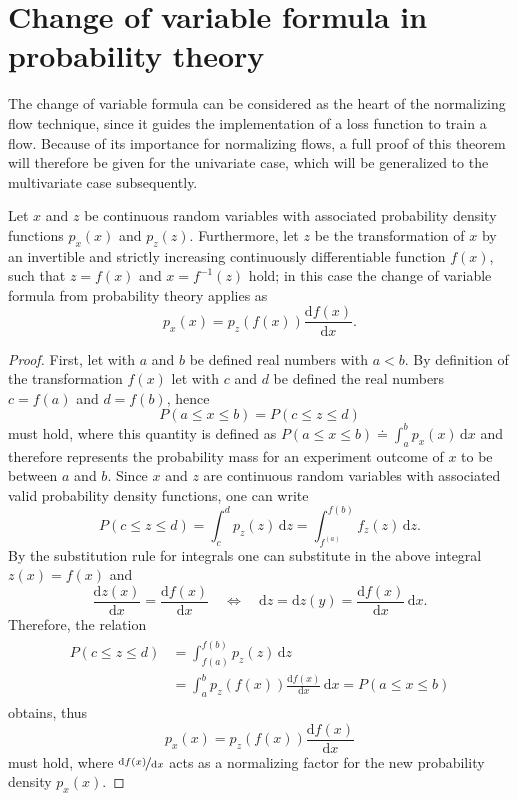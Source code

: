 \documentclass[a4paper,12pt]{report}
\begin{document}
\section{Change of variable formula in probability theory}
The change of variable formula can be considered as the heart of the normalizing flow technique, since it guides the implementation of a loss function to train a flow. Because of its importance for normalizing flows, a full proof of this theorem will therefore be given for the univariate case, which will be generalized to the multivariate case subsequently.
\begin{tm}
Let $x$ and $z$ be continuous random variables with associated probability density functions $p_x(x)$ and $p_z(z)$. Furthermore, let $z$ be the transformation of $x$ by an invertible and strictly increasing continuously differentiable function $f(x)$, such that $z=f(x)$ and $x = f^{-1}(z)$ hold; in this case the change of variable formula from probability theory applies as \begin{equation}
p_x(x) = p_z(f(x))\frac{\mathrm{d}f(x)}{\mathrm{d}x}.
\end{equation}
\end{tm}
\begin{proof}
First, let with $a$ and $b$ be defined real numbers with $a<b$. By definition of the transformation $f(x)$ let with $c$ and $d$ be defined the real numbers $c = f(a)$ and $d=f(b)$, hence \begin{equation}
P(a \leq x \leq b) = P(c \leq z \leq d)
\end{equation} must hold, where this quantity is defined as $P(a \leq x \leq b) \doteq \int_a^b p_x(x)\,\mathrm{d}x$ and therefore represents the probability mass for an experiment outcome of $x$ to be between $a$ and $b$. Since $x$ and $z$ are continuous random variables with associated valid probability density functions, one can write \begin{equation}
P(c \leq z \leq d) = \int_c^d p_z(z)\,\mathrm{d}z = \int_{f^(a)}^{f(b)}f_z(z)\,\mathrm{d}z.
\end{equation} By the substitution rule for integrals one can substitute in the above integral $z(x) = f(x)$ and \begin{equation}
\frac{\mathrm{d}z(x)}{\mathrm{d}x} = \frac{\mathrm{d}f(x)}{\mathrm{d}x} \quad \Leftrightarrow \quad \mathrm{d}z=\mathrm{d}z(y) = \frac{\mathrm{d}f(x)}{\mathrm{d}x}\,\mathrm{d}x.
\end{equation} Therefore, the relation \begin{align}\begin{aligned}
P(c \leq z \leq d) &= \int_{f(a)}^{f(b)}p_z(z)\,\mathrm{d}z \\ &= \int_{a}^{b}p_z(f(x))\frac{\mathrm{d}f(x)}{\mathrm{d}x}\,\mathrm{d}x = P(a \leq x \leq b)
\end{aligned}\end{align} obtains, thus
\begin{equation}
p_x(x) = p_z(f(x))\frac{\mathrm{d}f(x)}{\mathrm{d}x}
\end{equation}
must hold, where $\nicefrac{\mathrm{d}f(x)}{\mathrm{d}x}$ acts as a normalizing factor for the new probability density $p_x(x)$.
\end{proof}
\end{document}

